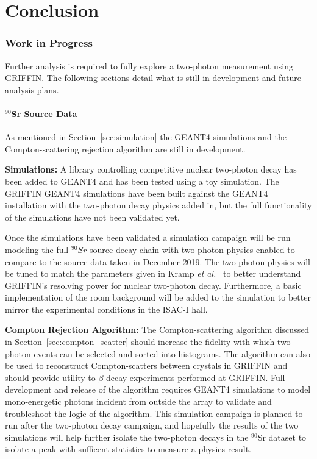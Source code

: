 \documentclass[cnatzke_thesis_proposal.tex]{subfiles}
\begin{document}
\chapter{Conclusion}

\subsection{Work in Progress}
Further analysis is required to fully explore a two-photon measurement using GRIFFIN. 
The following sections detail what is still in development and future analysis plans. 

\subsubsection{$^{90}$Sr Source Data}
As mentioned in Section~\ref{sec:simulation} the GEANT4 simulations and the Compton-scattering rejection algorithm are still in development. 

\textbf{Simulations:} A library controlling competitive nuclear two-photon decay has been added to GEANT4 and has been tested using a toy simulation.
The GRIFFIN GEANT4 simulations have been built against the GEANT4 installation with the two-photon decay physics added in, but the full functionality of the simulations have not been validated yet.

Once the simulations have been validated a simulation campaign will be run modeling the full $^{90}Sr$ source decay chain with two-photon physics enabled to compare to the source data taken in December 2019. 
The two-photon physics will be tuned to match the parameters given in Kramp \textit{et al.}~\cite{kramp_nuclear_1987} to better understand GRIFFIN's resolving power for nuclear two-photon decay. 
Furthermore, a basic implementation of the room background will be added to the simulation to better mirror the experimental conditions in the ISAC-I hall. 

\textbf{Compton Rejection Algorithm:} The Compton-scattering algorithm discussed in Section~\ref{sec:compton_scatter} should increase the fidelity with which two-photon events can be selected and sorted into histograms. 
The algorithm can also be used to reconstruct Compton-scatters between crystals in GRIFFIN and should provide utility to $\beta$-decay experiments performed at GRIFFIN. 
Full development and release of the algorithm requires GEANT4 simulations to model mono-energetic photons incident from outside the array to validate and troubleshoot the logic of the algorithm.
This simulation campaign is planned to run after the two-photon decay campaign, and hopefully the results of the two simulations will help further isolate the two-photon decays in the $^{90}$Sr dataset to isolate a peak with sufficent statistics to measure a physics result. 
\end{document}
